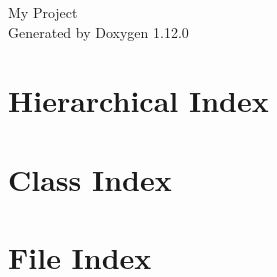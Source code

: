 \documentclass[twoside]{book}
\newcommand{\+}{\discretionary{\mbox{\scriptsize$\hookleftarrow$}}{}{}}
\newcommand{\clearemptydoublepage}{%
    \newpage{\pagestyle{empty}\cleardoublepage}%
  }
\begin{document}
  \raggedbottom
    \hypersetup{pageanchor=false,
                bookmarksnumbered=true,
                pdfencoding=unicode
               }
  \begin{titlepage}
  \vspace*{7cm}
  \begin{center}%
  {\Large My Project}\\
  \vspace*{1cm}
  {\large Generated by Doxygen 1.12.0}\\
  \end{center}
  \end{titlepage}
  \clearemptydoublepage
  \tableofcontents
  \clearemptydoublepage
  \hypersetup{pageanchor=true}
\chapter{Hierarchical Index}

\chapter{Class Index}

\chapter{File Index}

\end{document}
